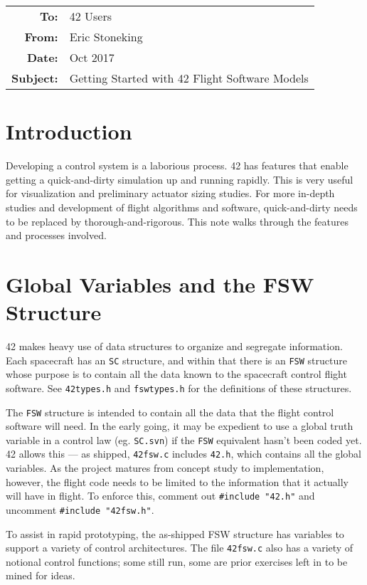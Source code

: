 \documentclass[12pt]{article}
\begin{document}
\begin{tabular}{@{} rl @{}}
    {\bf To:} & 42 Users\\ 
    {\bf From:} & Eric Stoneking \\ 
    {\bf Date:} & Oct 2017 \\ 
    {\bf Subject:} & Getting Started with 42 Flight Software Models\\ 
\hline
\end{tabular}
  
  
\section{Introduction}

Developing a control system is a laborious process.  42 has features that enable getting a quick-and-dirty simulation up and running rapidly.  This is very useful for visualization and preliminary actuator sizing studies.  For more in-depth studies and development of flight algorithms and software, quick-and-dirty needs to be replaced by thorough-and-rigorous.  This note walks through the features and processes involved.

\section{Global Variables and the FSW Structure}

42 makes heavy use of data structures to organize and segregate information.  Each spacecraft has an {\tt SC} structure, and within that there is an {\tt FSW} structure whose purpose is to contain all the data known to the spacecraft control flight software.  See {\tt 42types.h} and {\tt fswtypes.h} for the definitions of these structures.  

The {\tt FSW} structure is intended to contain all the data that the flight control software will need.  In the early going, it may be expedient to use a global truth variable in a control law (eg. {\tt SC.svn}) if the {\tt FSW} equivalent hasn't been coded yet.  42 allows this --- as shipped, {\tt 42fsw.c} includes {\tt 42.h}, which contains all the global variables.  As the project matures from concept study to implementation, however, the flight code needs to be limited to the information that it actually will have in flight.  To enforce this, comment out {\tt \#include "42.h"} and uncomment {\tt \#include "42fsw.h"}.  

To assist in rapid prototyping, the as-shipped FSW structure has variables to support a variety of control architectures.  The file {\tt 42fsw.c} also has a variety of notional control functions; some still run, some are prior exercises left in to be mined for ideas.
\end{document}

